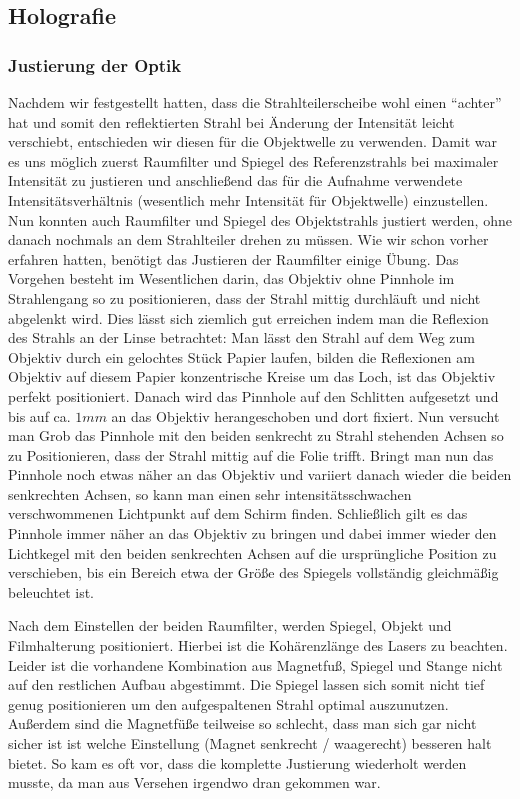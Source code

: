 \documentclass[12pt]{article}
\begin{document}
\subsection{Holografie}
\subsubsection{Justierung der Optik}
Nachdem wir festgestellt hatten, dass die Strahlteilerscheibe wohl einen ``achter'' hat und somit den reflektierten Strahl bei Änderung der Intensität leicht
verschiebt, entschieden wir diesen für die Objektwelle zu verwenden. Damit war es uns möglich zuerst Raumfilter und Spiegel des Referenzstrahls bei maximaler
Intensität zu justieren und anschließend das für die Aufnahme verwendete Intensitätsverhältnis (wesentlich mehr Intensität für Objektwelle) einzustellen. Nun 
konnten auch Raumfilter und Spiegel des Objektstrahls justiert werden, ohne danach nochmals an dem Strahlteiler drehen zu müssen.
Wie wir schon vorher erfahren hatten, benötigt das Justieren der Raumfilter einige Übung. Das Vorgehen besteht im Wesentlichen darin, das Objektiv
ohne Pinnhole im Strahlengang so zu positionieren, dass der Strahl mittig durchläuft und nicht abgelenkt wird. Dies lässt sich ziemlich gut erreichen
indem
man die Reflexion des Strahls an der Linse betrachtet: Man lässt den Strahl auf dem Weg zum Objektiv durch ein gelochtes Stück Papier laufen, bilden die 
Reflexionen am Objektiv auf diesem Papier konzentrische Kreise um das Loch, ist das Objektiv perfekt positioniert.
Danach wird das Pinnhole auf den Schlitten aufgesetzt
und bis auf ca. $1mm$ an das Objektiv herangeschoben und dort fixiert. Nun versucht man Grob das Pinnhole mit den beiden senkrecht zu Strahl stehenden Achsen
so zu Positionieren, dass der Strahl mittig auf die Folie trifft. Bringt man nun das Pinnhole noch etwas näher an das Objektiv und variiert danach wieder die
beiden senkrechten Achsen, so kann man einen sehr intensitätsschwachen verschwommenen Lichtpunkt auf dem Schirm finden. Schließlich gilt es das Pinnhole immer
näher an das Objektiv zu bringen und dabei immer wieder den Lichtkegel mit den beiden senkrechten Achsen auf die ursprüngliche Position zu verschieben, bis 
ein Bereich etwa der Größe des Spiegels vollständig gleichmäßig beleuchtet ist.

Nach dem Einstellen der beiden Raumfilter, werden Spiegel, Objekt und Filmhalterung positioniert. Hierbei ist die Kohärenzlänge des Lasers zu beachten.
Leider ist die vorhandene Kombination aus Magnetfuß, Spiegel und Stange nicht auf den restlichen Aufbau abgestimmt. Die Spiegel lassen sich somit nicht tief
genug positionieren um den aufgespaltenen Strahl optimal auszunutzen. Außerdem sind die Magnetfüße teilweise so schlecht, dass man sich gar nicht sicher ist
ist welche Einstellung (Magnet senkrecht / waagerecht) besseren halt bietet. So kam es oft vor, dass die komplette Justierung wiederholt werden musste, da man
aus Versehen irgendwo dran gekommen war.
\end{document}

